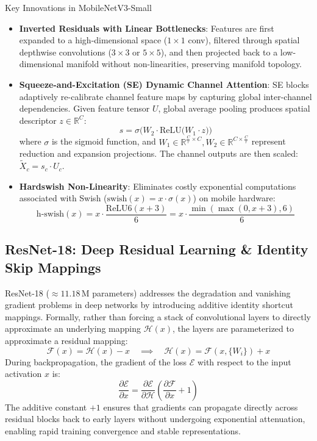 \documentclass[11pt,a4paper]{article}
\begin{document}
\begin{conceptbox}{Key Innovations in MobileNetV3-Small}
\begin{itemize}
    \item \textbf{Inverted Residuals with Linear Bottlenecks}: Features are first expanded to a high-dimensional space ($1\times 1$ conv), filtered through spatial depthwise convolutions ($3\times 3$ or $5\times 5$), and then projected back to a low-dimensional manifold without non-linearities, preserving manifold topology.
    \item \textbf{Squeeze-and-Excitation (SE) Dynamic Channel Attention}: SE blocks adaptively re-calibrate channel feature maps by capturing global inter-channel dependencies. Given feature tensor $U$, global average pooling produces spatial descriptor $z \in \mathbb{R}^C$:
    \begin{equation}
        s = \sigma\Big(W_2 \cdot \text{ReLU}\big(W_1 \cdot z\big)\Big)
    \end{equation}
    where $\sigma$ is the sigmoid function, and $W_1 \in \mathbb{R}^{\frac{C}{r} \times C}, W_2 \in \mathbb{R}^{C \times \frac{C}{r}}$ represent reduction and expansion projections. The channel outputs are then scaled: $\widetilde{X}_c = s_c \cdot U_c$.
    \item \textbf{Hardswish Non-Linearity}: Eliminates costly exponential computations associated with Swish ($\text{swish}(x) = x \cdot \sigma(x)$) on mobile hardware:
    \begin{equation}
        \text{h-swish}(x) = x \cdot \frac{\text{ReLU6}(x + 3)}{6} = x \cdot \frac{\min(\max(0, x + 3), 6)}{6}
    \end{equation}
\end{itemize}
\end{conceptbox}

\subsection{ResNet-18: Deep Residual Learning \& Identity Skip Mappings}
ResNet-18 ($\approx 11.18$\,M parameters) addresses the degradation and vanishing gradient problems in deep networks by introducing additive identity shortcut mappings. Formally, rather than forcing a stack of convolutional layers to directly approximate an underlying mapping $\mathcal{H}(x)$, the layers are parameterized to approximate a residual mapping:
\begin{equation}
    \mathcal{F}(x) = \mathcal{H}(x) - x \quad \implies \quad \mathcal{H}(x) = \mathcal{F}(x, \{W_i\}) + x
\end{equation}
During backpropagation, the gradient of the loss $\mathcal{E}$ with respect to the input activation $x$ is:
\begin{equation}
    \frac{\partial \mathcal{E}}{\partial x} = \frac{\partial \mathcal{E}}{\partial \mathcal{H}} \left( \frac{\partial \mathcal{F}}{\partial x} + 1 \right)
\end{equation}
The additive constant $+1$ ensures that gradients can propagate directly across residual blocks back to early layers without undergoing exponential attenuation, enabling rapid training convergence and stable representations.
\end{document}
